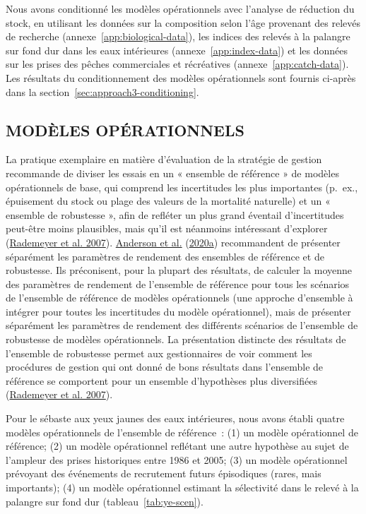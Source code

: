 \documentclass[11pt]{book}
\begin{document}
Nous avons conditionné les modèles opérationnels avec l'analyse de réduction du stock, en utilisant les données sur la composition selon l'âge provenant des relevés de recherche (annexe~\ref{app:biological-data}), les indices des relevés à la palangre sur fond dur dans les eaux intérieures (annexe~\ref{app:index-data}) et les données sur les prises des pêches commerciales et récréatives (annexe~\ref{app:catch-data}). Les résultats du conditionnement des modèles opérationnels sont fournis ci-après dans la section~\ref{sec:approach3-conditioning}.

\hypertarget{sec:approach3-oms}{%
\subsection{MODÈLES OPÉRATIONNELS}\label{sec:approach3-oms}}

La pratique exemplaire en matière d'évaluation de la stratégie de gestion recommande de diviser les essais en un « ensemble de référence » de modèles opérationnels de base, qui comprend les incertitudes les plus importantes (p.~ex., épuisement du stock ou plage des valeurs de la mortalité naturelle) et un « ensemble de robustesse », afin de refléter un plus grand éventail d'incertitudes peut-être moins plausibles, mais qu'il est néanmoins intéressant d'explorer (\protect\hyperlink{ref-rademeyer2007}{Rademeyer et al. 2007}). \protect\hyperlink{ref-anderson2020gfmp}{Anderson et al.} (\protect\hyperlink{ref-anderson2020gfmp}{2020a}) recommandent de présenter séparément les paramètres de rendement des ensembles de référence et de robustesse. Ils préconisent, pour la plupart des résultats, de calculer la moyenne des paramètres de rendement de l'ensemble de référence pour tous les scénarios de l'ensemble de référence de modèles opérationnels (une approche d'ensemble à intégrer pour toutes les incertitudes du modèle opérationnel), mais de présenter séparément les paramètres de rendement des différents scénarios de l'ensemble de robustesse de modèles opérationnels. La présentation distincte des résultats de l'ensemble de robustesse permet aux gestionnaires de voir comment les procédures de gestion qui ont donné de bons résultats dans l'ensemble de référence se comportent pour un ensemble d'hypothèses plus diversifiées (\protect\hyperlink{ref-rademeyer2007}{Rademeyer et al. 2007}).

Pour le sébaste aux yeux jaunes des eaux intérieures, nous avons établi quatre modèles opérationnels de l'ensemble de référence~: (1) un modèle opérationnel de référence; (2) un modèle opérationnel reflétant une autre hypothèse au sujet de l'ampleur des prises historiques entre 1986 et 2005; (3) un modèle opérationnel prévoyant des événements de recrutement futurs épisodiques (rares, mais importants); (4) un modèle opérationnel estimant la sélectivité dans le relevé à la palangre sur fond dur (tableau~\ref{tab:ye-scen}).
\end{document}
